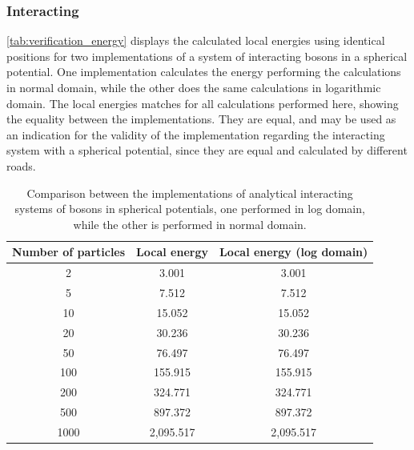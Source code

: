 \subsubsection{Interacting}
\autoref{tab:verification_energy} displays the calculated local energies using identical positions for two implementations of a system of interacting bosons in a spherical potential. One implementation calculates the energy performing the calculations in normal domain, while the other does the same calculations in logarithmic domain. The local energies matches for all calculations performed here, showing the equality between the implementations. They are equal, and may be used as an indication for the validity of the implementation regarding the interacting system with a spherical potential, since they are equal and calculated by different roads. 
\begin{table}[H]
    \centering
\begin{tabular}{c|c|c}
\hline \hline
 Number of particles &  Local energy &  Local energy (log domain) \\
\hline \hline
                   2 &         3.001 &                    3.001 \\
                   5 &         7.512 &                    7.512 \\
                  10 &        15.052 &                   15.052 \\
                  20 &        30.236 &                   30.236 \\
                  50 &        76.497 &                   76.497 \\
                 100 &       155.915 &                  155.915 \\
                 200 &       324.771 &                  324.771 \\
                 500 &       897.372 &                  897.372 \\
                1000 &     2,095.517 &                2,095.517 \\
\hline \hline
\end{tabular}
    \caption{Comparison between the implementations of analytical interacting systems of bosons in spherical potentials, one performed in log domain, while the other is performed in normal domain.}
    \label{tab:verification_energy}
\end{table}


